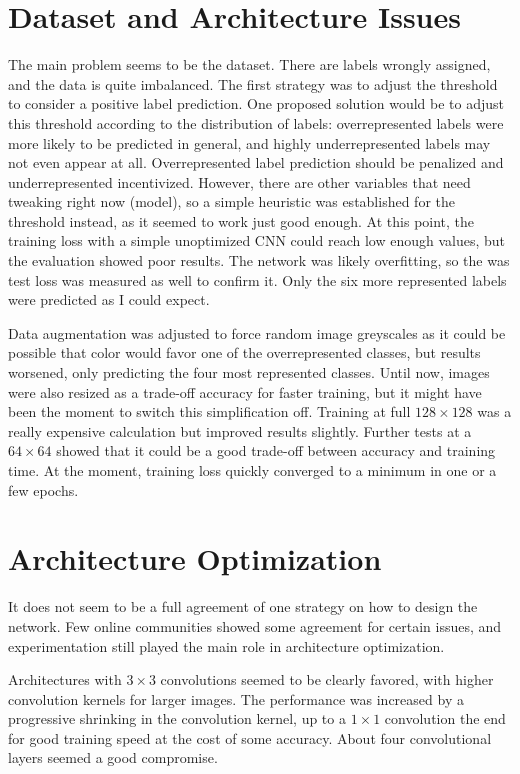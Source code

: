 \documentclass{article}
\begin{document}
\section{Dataset and Architecture Issues}
The main problem seems to be the dataset.
There are labels wrongly assigned, and the data is quite imbalanced.
The first strategy was to adjust the threshold to consider a positive label prediction.
One proposed solution would be to adjust this threshold according to the distribution of labels: overrepresented labels were more likely to be predicted in general, and highly underrepresented labels may not even appear at all.
Overrepresented label prediction should be penalized and underrepresented incentivized.
However, there are other variables that need tweaking right now (model), so a simple heuristic was established for the threshold instead, as it seemed to work just good enough.
At this point, the training loss with a simple unoptimized CNN could reach low enough values, but the evaluation showed poor results.
The network was likely overfitting, so the was test loss was measured as well to confirm it.
Only the six more represented labels were predicted as I could expect.

Data augmentation was adjusted to force random image greyscales as it could be possible that color would favor one of the overrepresented classes, but results worsened, only predicting the four most represented classes.
Until now, images were also resized as a trade-off accuracy for faster training, but it might have been the moment to switch this simplification off.
Training at full \(128 \times 128\) was a really expensive calculation but improved results slightly.
Further tests at a \(64 \times 64\) showed that it could be a good trade-off between accuracy and training time.
At the moment, training loss quickly converged to a minimum in one or a few epochs.


\section{Architecture Optimization}
It does not seem to be a full agreement of one strategy on how to design the network.
Few online communities showed some agreement for certain issues, and experimentation still played the main role in architecture optimization.

Architectures with \(3 \times 3\) convolutions seemed to be clearly favored, with higher convolution kernels for larger images.
The performance was increased by a progressive shrinking in the convolution kernel, up to a \(1 \times 1\) convolution the end for good training speed at the cost of some accuracy.
About four convolutional layers seemed a good compromise.
\end{document}

